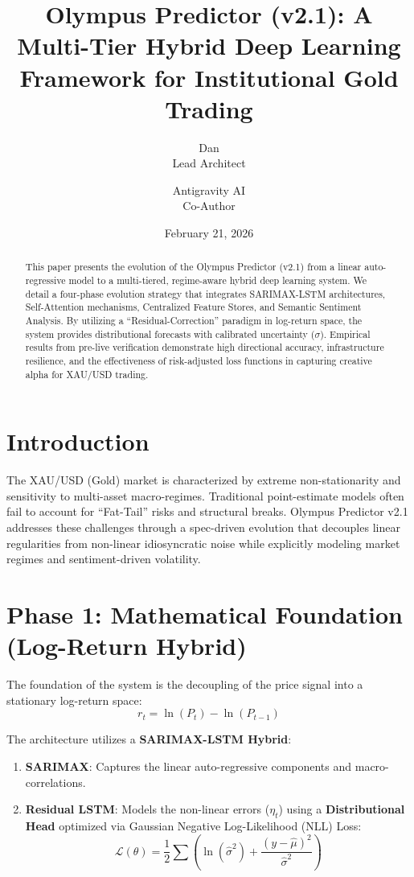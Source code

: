 \documentclass[11pt, a4paper]{article}
\title{Olympus Predictor (v2.1): A Multi-Tier Hybrid Deep Learning Framework for Institutional Gold Trading}
\author{Dan \\ Lead Architect \and Antigravity AI \\ Co-Author}
\date{February 21, 2026}
\begin{document}
\maketitle

\begin{abstract}
This paper presents the evolution of the Olympus Predictor (v2.1) from a linear auto-regressive model to a multi-tiered, regime-aware hybrid deep learning system. We detail a four-phase evolution strategy that integrates SARIMAX-LSTM architectures, Self-Attention mechanisms, Centralized Feature Stores, and Semantic Sentiment Analysis. By utilizing a ``Residual-Correction'' paradigm in log-return space, the system provides distributional forecasts with calibrated uncertainty ($\sigma$). Empirical results from pre-live verification demonstrate high directional accuracy, infrastructure resilience, and the effectiveness of risk-adjusted loss functions in capturing creative alpha for XAU/USD trading.
\end{abstract}

\section{Introduction}
The XAU/USD (Gold) market is characterized by extreme non-stationarity and sensitivity to multi-asset macro-regimes. Traditional point-estimate models often fail to account for ``Fat-Tail'' risks and structural breaks. Olympus Predictor v2.1 addresses these challenges through a spec-driven evolution that decouples linear regularities from non-linear idiosyncratic noise while explicitly modeling market regimes and sentiment-driven volatility.

\section{Phase 1: Mathematical Foundation (Log-Return Hybrid)}
The foundation of the system is the decoupling of the price signal into a stationary log-return space:
\begin{equation}
r_t = \ln(P_t) - \ln(P_{t-1})
\end{equation}

The architecture utilizes a \textbf{SARIMAX-LSTM Hybrid}:
\begin{enumerate}
    \item \textbf{SARIMAX}: Captures the linear auto-regressive components and macro-correlations.
    \item \textbf{Residual LSTM}: Models the non-linear errors ($\eta_t$) using a \textbf{Distributional Head} optimized via Gaussian Negative Log-Likelihood (NLL) Loss:
    \begin{equation}
    \mathcal{L}(\theta) = \frac{1}{2} \sum \left( \ln(\hat{\sigma}^2) + \frac{(y - \hat{\mu})^2}{\hat{\sigma}^2} \right)
    \end{equation}
\end{enumerate}
\end{document}
